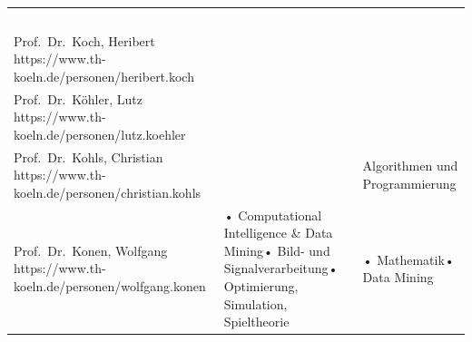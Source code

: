\begin{longtable}[]{@{}lll@{}}
\begin{minipage}[t]{0.30\columnwidth}
~\strut
\end{minipage} & \begin{minipage}[t]{0.30\columnwidth}\raggedright\strut
\strut
\end{minipage}\tabularnewline
\begin{minipage}[t]{0.30\columnwidth}\raggedright\strut
Prof.~Dr.~Koch, Heribert
https://www.th-koeln.de/personen/heribert.koch\strut
\end{minipage} & \begin{minipage}[t]{0.30\columnwidth}\raggedright\strut
~\strut
\end{minipage} & \begin{minipage}[t]{0.30\columnwidth}\raggedright\strut
\strut
\end{minipage}\tabularnewline
\begin{minipage}[t]{0.30\columnwidth}\raggedright\strut
Prof.~Dr.~Köhler, Lutz
https://www.th-koeln.de/personen/lutz.koehler\strut
\end{minipage} & \begin{minipage}[t]{0.30\columnwidth}\raggedright\strut
~\strut
\end{minipage} & \begin{minipage}[t]{0.30\columnwidth}\raggedright\strut
\strut
\end{minipage}\tabularnewline
\begin{minipage}[t]{0.30\columnwidth}\raggedright\strut
Prof.~Dr.~Kohls, Christian
https://www.th-koeln.de/personen/christian.kohls\strut
\end{minipage} & \begin{minipage}[t]{0.30\columnwidth}\raggedright\strut
~\strut
\end{minipage} & \begin{minipage}[t]{0.30\columnwidth}\raggedright\strut
Algorithmen und Programmierung\strut
\end{minipage}\tabularnewline
\begin{minipage}[t]{0.30\columnwidth}\raggedright\strut
Prof.~Dr.~Konen, Wolfgang
https://www.th-koeln.de/personen/wolfgang.konen\strut
\end{minipage} & \begin{minipage}[t]{0.30\columnwidth}\raggedright\strut
• Computational Intelligence \& Data Mining• Bild- und
Signalverarbeitung• Optimierung, Simulation, Spieltheorie\strut
\end{minipage} & \begin{minipage}[t]{0.30\columnwidth}\raggedright\strut
• Mathematik• Data Mining\strut
\end{minipage}\tabularnewline

\end{longtable}
